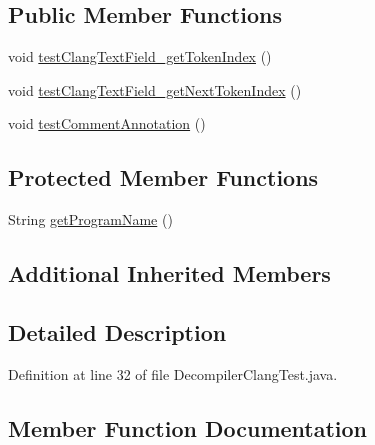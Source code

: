 \subsection*{Public Member Functions}
\begin{DoxyCompactItemize}
\item 
void \mbox{\hyperlink{classghidra_1_1app_1_1plugin_1_1core_1_1decompile_1_1_decompiler_clang_test_a5133154654c62a8d068d48fc9f013f79}{test\+Clang\+Text\+Field\+\_\+get\+Token\+Index}} ()
\item 
void \mbox{\hyperlink{classghidra_1_1app_1_1plugin_1_1core_1_1decompile_1_1_decompiler_clang_test_a1fde4a416e006da18ed02f4e4496954d}{test\+Clang\+Text\+Field\+\_\+get\+Next\+Token\+Index}} ()
\item 
void \mbox{\hyperlink{classghidra_1_1app_1_1plugin_1_1core_1_1decompile_1_1_decompiler_clang_test_aae9092113dcff1e5871fa23682cbc1e4}{test\+Comment\+Annotation}} ()
\end{DoxyCompactItemize}
\subsection*{Protected Member Functions}
\begin{DoxyCompactItemize}
\item 
String \mbox{\hyperlink{classghidra_1_1app_1_1plugin_1_1core_1_1decompile_1_1_decompiler_clang_test_abbedbfe14f3cfed17732c1867cb72014}{get\+Program\+Name}} ()
\end{DoxyCompactItemize}
\subsection*{Additional Inherited Members}


\subsection{Detailed Description}


Definition at line 32 of file Decompiler\+Clang\+Test.\+java.



\subsection{Member Function Documentation}
\mbox{\label{classghidra_1_1app_1_1plugin_1_1core_1_1decompile_1_1_decompiler_clang_test_abbedbfe14f3cfed17732c1867cb72014}} 
